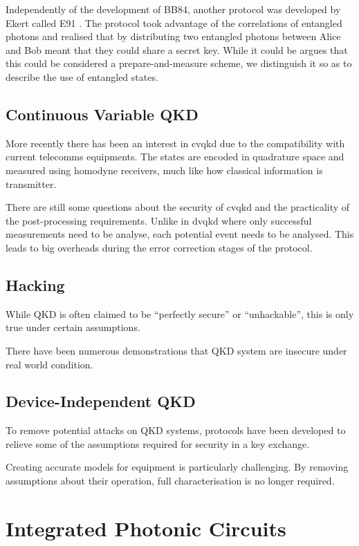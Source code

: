 Independently of the development of BB84, another protocol was developed by Ekert called E91 \cite{E91}. The protocol took advantage of the correlations of entangled photons and realised that by distributing two entangled photons between Alice and Bob meant that they could share a secret key. While it could be argues that this could be considered a prepare-and-measure scheme, we distinguish it so as to describe the use of entangled states.

\subsection{Continuous Variable QKD}

More recently there has been an interest in \ac{cvqkd} due to the compatibility with current telecomms equipments. The states are encoded in quadrature space and measured using homodyne receivers, much like how classical information is transmitter.

There are still some questions about the security of \ac{cvqkd} and the practicality of the post-processing requirements. Unlike in \ac{dvqkd} where only successful measurements need to be analyse, each potential event needs to be analysed. This leads to big overheads during the error correction stages of the protocol.

\subsection{Hacking}

While \ac{QKD} is often claimed to be ``perfectly secure'' or ``unhackable'', this is only true under certain assumptions. 

There have been numerous demonstrations that \ac{QKD} system are insecure under real world condition.

\subsection*{Device-Independent QKD}

To remove potential attacks on \ac{QKD} systems, protocols have been developed to relieve some of the assumptions required for security in a key exchange. 

Creating accurate models for equipment is particularly challenging. By removing assumptions about their operation, full characterisation is no longer required.

\section{Integrated Photonic Circuits}

